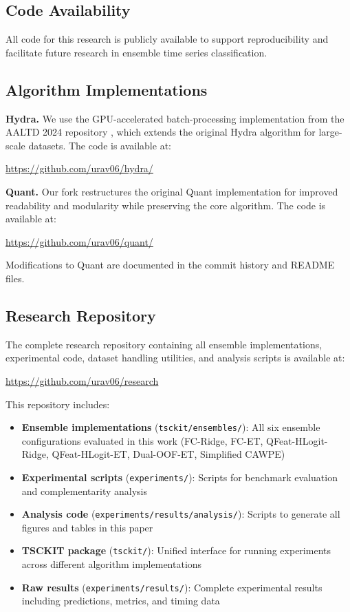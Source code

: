 \documentclass[pdflatex,sn-basic]{sn-jnl}           %
\theoremstyle{thmstyleone}%
\theoremstyle{thmstyletwo}%
\theoremstyle{thmstylethree}%
\begin{document}
\begin{appendices}
\clearpage

\section{Code Availability}\label{appF}

All code for this research is publicly available to support reproducibility and facilitate future research in ensemble time series classification.

\subsection{Algorithm Implementations}

\textbf{Hydra.} We use the GPU-accelerated batch-processing implementation from the AALTD 2024 repository \citep{aaltd2024}, which extends the original Hydra algorithm for large-scale datasets. The code is available at:

\url{https://github.com/urav06/hydra/}

\textbf{Quant.} Our fork restructures the original Quant implementation for improved readability and modularity while preserving the core algorithm. The code is available at:

\url{https://github.com/urav06/quant/}

Modifications to Quant are documented in the commit history and README files.

\subsection{Research Repository}

The complete research repository containing all ensemble implementations, experimental code, dataset handling utilities, and analysis scripts is available at:

\url{https://github.com/urav06/research}

This repository includes:

\begin{itemize}
\item \textbf{Ensemble implementations} (\texttt{tsckit/ensembles/}): All six ensemble configurations evaluated in this work (FC-Ridge, FC-ET, QFeat-HLogit-Ridge, QFeat-HLogit-ET, Dual-OOF-ET, Simplified CAWPE)
\item \textbf{Experimental scripts} (\texttt{experiments/}): Scripts for benchmark evaluation and complementarity analysis
\item \textbf{Analysis code} (\texttt{experiments/results/analysis/}): Scripts to generate all figures and tables in this paper
\item \textbf{TSCKIT package} (\texttt{tsckit/}): Unified interface for running experiments across different algorithm implementations
\item \textbf{Raw results} (\texttt{experiments/results/}): Complete experimental results including predictions, metrics, and timing data
\end{itemize}


\end{appendices}
\end{document}
